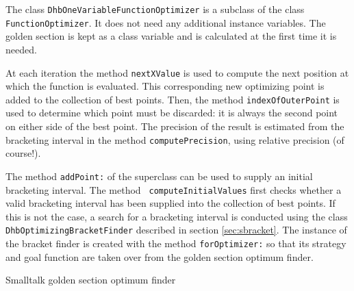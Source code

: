 \documentclass[twoside]{book}
\begin{document}
The class {\tt DhbOneVariableFunctionOptimizer} is a subclass of
the class {\tt FunctionOptimizer}. It does not need any additional
instance variables. The golden section is kept as a class variable
and is calculated at the first time it is needed.

At each iteration the method {\tt nextXValue} is used to compute
the next position at which the function is evaluated. This
corresponding new optimizing point is added to the collection of
best points. Then, the method {\tt indexOfOuterPoint} is used to
determine which point must be discarded: it is always the second
point on either side of the best point. The precision of the
result is estimated from the bracketing interval in the method
{\tt computePrecision}, using relative precision (of course!).

The method {\tt addPoint:} of the superclass can be used to supply
an initial bracketing interval. The method {\tt
computeInitialValues} first checks whether a valid bracketing
interval has been supplied into the collection of best points. If
this is not the case, a search for a bracketing interval is
conducted using the class {\tt DhbOptimizingBracketFinder}
described in section \ref{sec:sbracket}. The instance of the
bracket finder is created with the method {\tt forOptimizer:} so
that its strategy and goal function are taken over from the golden
section optimum finder.

\begin{listing} Smalltalk golden section optimum finder \label{ls:optimizerOneDim}

\end{listing}
\end{document}
